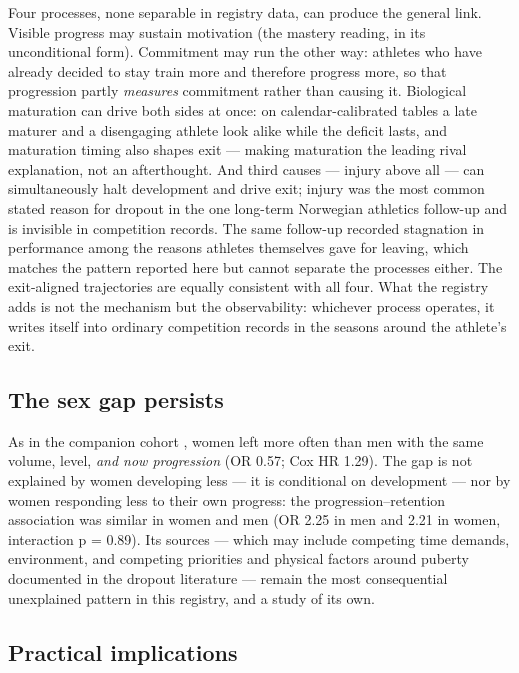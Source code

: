 \documentclass[12pt,a4paper]{article}
\begin{document}
Four processes, none separable in registry data, can produce the general link. Visible progress may sustain motivation (the mastery reading, in its unconditional form). Commitment may run the other way: athletes who have already decided to stay train more and therefore progress more, so that progression partly \emph{measures} commitment rather than causing it. Biological maturation can drive both sides at once: on calendar-calibrated tables a late maturer and a disengaging athlete look alike while the deficit lasts, and maturation timing also shapes exit --- making maturation the leading rival explanation, not an afterthought. And third causes --- injury above all --- can simultaneously halt development and drive exit; injury was the most common stated reason for dropout in the one long-term Norwegian athletics follow-up \cite{enoksen2011} and is invisible in competition records. The same follow-up recorded stagnation in performance among the reasons athletes themselves gave for leaving, which matches the pattern reported here but cannot separate the processes either. The exit-aligned trajectories are equally consistent with all four. What the registry adds is not the mechanism but the observability: whichever process operates, it writes itself into ordinary competition records in the seasons around the athlete's exit.

\subsection{The sex gap persists}

As in the companion cohort \cite{guttormsen2026dropout}, women left more often than men with the same volume, level, \emph{and now progression} (OR 0.57; Cox HR 1.29). The gap is not explained by women developing less --- it is conditional on development --- nor by women responding less to their own progress: the progression--retention association was similar in women and men (OR 2.25 in men and 2.21 in women, interaction p = 0.89). Its sources --- which may include competing time demands, environment, and competing priorities and physical factors around puberty documented in the dropout literature \cite{crane2015,fraserthomas2008} --- remain the most consequential unexplained pattern in this registry, and a study of its own.

\subsection{Practical implications}
\end{document}

